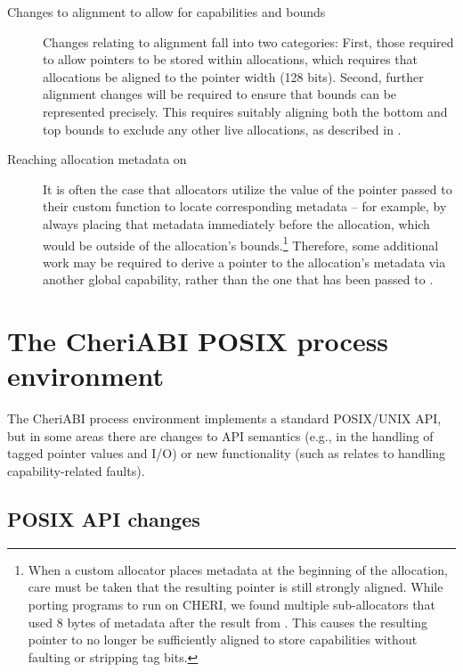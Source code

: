 \documentclass[12pt,twoside,openright,usletter]{article}
\newcommand{\ccode}[1]{{\small\ttfamily{#1}}}
\newcommand{\cfunc}[1]{{\ccode{#1()}}}
\newcommand{\note}[2]{{\color{blue}[ Note: #1 - #2]}}
\renewcommand{\note}[2]{\relax\ifhmode\unskip\fi}
\newcommand{\arnote}[1]{\note{#1}{Alex R.}}
\begin{document}
\begin{description}
\item[Changes to alignment to allow for capabilities and bounds]
  Changes relating to alignment fall into two categories:
  First, those required to allow pointers to be stored within allocations,
  which requires that allocations be aligned to the pointer width (128 bits).
  Second, further alignment changes will be required to ensure that bounds can
  be represented precisely.
  This requires suitably aligning both the bottom and top bounds to exclude
  any other live allocations, as described in
  .\arnote{May want to switch order of sections?}

\item[Reaching allocation metadata on \cfunc{free}]
  It is often the case that allocators utilize the value of the pointer passed
  to their custom \cfunc{free} function to locate corresponding metadata --
  for example, by always placing that metadata immediately before the
  allocation, which would be outside of the allocation's bounds.\footnote{%
  When a custom allocator places metadata at the beginning of the allocation,
  care must be taken that the resulting pointer is still strongly aligned.
  While porting programs to run on CHERI, we found multiple sub-allocators
  that used 8 bytes of metadata after the result from \cfunc{malloc}.
  This causes the resulting pointer to no longer be sufficiently aligned to
  store capabilities without faulting or stripping tag bits.
  \note{Does CHERI ISAv7 still fault in any of these scenarios?}{nwf}
  }
  Therefore, some additional work may be required to derive a pointer to the
  allocation's metadata via another global capability, rather than the one
  that has been passed to \cfunc{free}.
\end{description}

\section{The CheriABI POSIX process environment}
\label{sec:cheriabi}

The CheriABI process environment implements a standard POSIX/UNIX API, but in
some areas there are changes to API semantics (e.g., in the handling of tagged
pointer values and I/O) or new functionality (such as relates to handling
capability-related faults).

\subsection{POSIX API changes}
\end{document}
